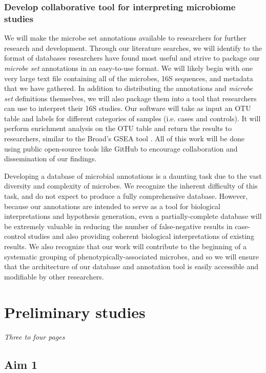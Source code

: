 \documentclass[12pt]{article}
\begin{document}
\subsubsection{Develop collaborative tool for interpreting microbiome studies}
We will make the microbe set annotations available to researchers for 
further research and development. Through our literature searches, 
we will identify to the format of databases researchers have found most 
useful and strive to package our \textit{microbe set} annotations in an easy-to-use format. 
We will likely begin with one very large text file containing all of 
the microbes, 16S sequences, and metadata that we have gathered. In addition to distributing the annotations and \textit{microbe set} definitions themselves, we will also package them into a tool 
that researchers can use to interpret their 16S 
studies. Our software will take as input an OTU table and labels for different categories
of samples (i.e. cases and controls). 
It will perform enrichment analysis on the OTU table and return the 
results to researchers, similar to the Broad's GSEA tool \cite{subramanian-gsea-2005}. All of this work will be done using public open-source tools like 
GitHub to encourage collaboration and dissemination of our findings.

Developing a database of microbial annotations is a daunting task due 
to the vast diversity and complexity of microbes. We recognize the 
inherent difficulty of this task, and do not expect to produce a fully 
comprehensive database. However, because our annotations are intended 
to serve as a tool for biological interpretations and hypothesis 
generation, even a partially-complete database will be extremely 
valuable in reducing the number of false-negative results in case-
control studies and also providing coherent biological interpretations 
of existing results. We also recognize that our work will contribute to the 
beginning of a systematic grouping of phenotypically-associated 
microbes, and so we will ensure that the architecture of our database and annotation tool 
is easily accessible and modifiable by other researchers.


\section{Preliminary studies}
\textit{Three to four pages}

\subsection{Aim 1}
\end{document}
